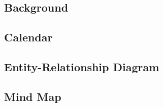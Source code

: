 \subsection*{Background}



\subsection*{Calendar}



\subsection*{Entity-Relationship Diagram}



\subsection*{Mind Map}

\ \\
